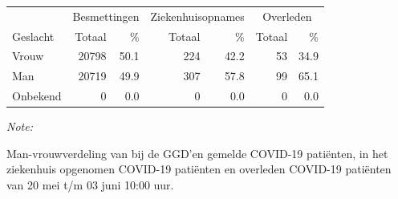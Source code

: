 \documentclass[
  english,
  man,floatsintext]{apa6}
\begin{document}
\begin{table}
\centering\begingroup\fontsize{11}{13}\selectfont

\begin{threeparttable}
\begin{tabular}{lrrrrrr}
\toprule
\multicolumn{1}{c}{ } & \multicolumn{2}{c}{Besmettingen} & \multicolumn{2}{c}{Ziekenhuisopnames} & \multicolumn{2}{c}{Overleden} \\
\cmidrule(l{3pt}r{3pt}){2-3} \cmidrule(l{3pt}r{3pt}){4-5} \cmidrule(l{3pt}r{3pt}){6-7}
Geslacht & Totaal & \% & Totaal & \% & Totaal & \%\\
\midrule
Vrouw & 20798 & 50.1 & 224 & 42.2 & 53 & 34.9\\
Man & 20719 & 49.9 & 307 & 57.8 & 99 & 65.1\\
Onbekend & 0 & 0.0 & 0 & 0.0 & 0 & 0.0\\
\bottomrule
\end{tabular}
\begin{tablenotes}
\item \textit{Note: } 
\item Man-vrouwverdeling van bij de GGD’en gemelde COVID-19 patiënten, in het ziekenhuis opgenomen COVID-19 patiënten en overleden COVID-19 patiënten van 20 mei t/m 03 juni 10:00 uur.
\end{tablenotes}
\end{threeparttable}
\endgroup{}
\end{table}
\newpage
\end{document}
